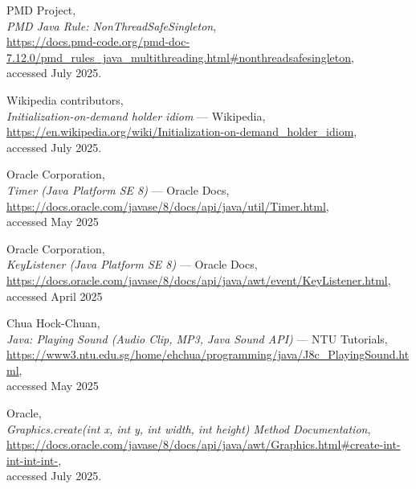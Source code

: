 \documentclass[a4paper,12pt]{report}
\begin{document}
\begin{thebibliography}{9}

    PMD Project,\\
    \emph{PMD Java Rule: NonThreadSafeSingleton},\\
    \url{https://docs.pmd-code.org/pmd-doc-7.12.0/pmd_rules_java_multithreading.html#nonthreadsafesingleton},\\
    accessed July 2025.
    
    Wikipedia contributors,\\
    \emph{Initialization-on-demand holder idiom} --- Wikipedia,\\
    \url{https://en.wikipedia.org/wiki/Initialization-on-demand_holder_idiom},\\
    accessed July 2025.

    
    Oracle Corporation,\\
    \emph{Timer (Java Platform SE 8)} --- Oracle Docs,\\
    \url{https://docs.oracle.com/javase/8/docs/api/java/util/Timer.html},\\
    accessed May 2025

    Oracle Corporation,\\
    \emph{KeyListener (Java Platform SE 8)} --- Oracle Docs,\\
    \url{https://docs.oracle.com/javase/8/docs/api/java/awt/event/KeyListener.html},\\
    accessed April 2025

    Chua Hock-Chuan,\\
    \emph{Java: Playing Sound (Audio Clip, MP3, Java Sound API)} --- NTU Tutorials,\\
    \url{https://www3.ntu.edu.sg/home/ehchua/programming/java/J8c_PlayingSound.html},\\
    accessed May 2025

    Oracle,\\
    \emph{Graphics.create(int x, int y, int width, int height) Method Documentation},\\
    \url{https://docs.oracle.com/javase/8/docs/api/java/awt/Graphics.html#create-int-int-int-int-},\\
    accessed July 2025.

    \end{thebibliography}
\end{document}
